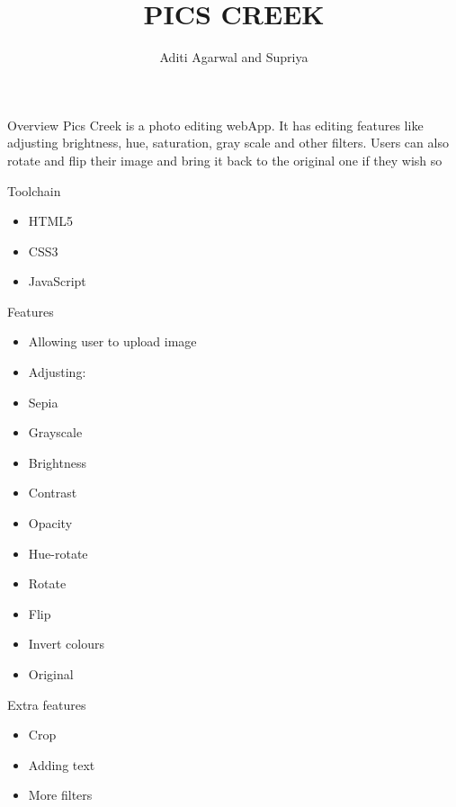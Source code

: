 \documentclass{beamer}
\begin{document}
\title{PICS CREEK}
\author{Aditi Agarwal and Supriya}
\begin{frame}

\titlepage
\end{frame}
\begin{frame}{Overview}
Pics Creek is a photo editing webApp. It has editing features like adjusting brightness, hue, saturation, gray scale and other filters. Users can also rotate and flip their image and bring it back to the original one if they wish so
\end{frame}



\begin{frame}{Toolchain}
\begin{itemize}

     \item HTML5
     \item CSS3
     \item JavaScript
     
\end{itemize}
\end{frame}


\begin{frame}{Features}
\begin{itemize}
    \item Allowing user to upload image
    \item Adjusting:
    \item Sepia
    \item Grayscale
    \item Brightness
    \item Contrast
    \item Opacity
    \item Hue-rotate
    \item Rotate
    \item Flip
    \item Invert colours
    \item Original
    

\end{itemize}    
\end{frame}

\begin{frame}{Extra features}
\begin{itemize}
    \item Crop
    \item Adding text
    \item More filters
    
\end{itemize}
    
\end{frame}
\end{document}
